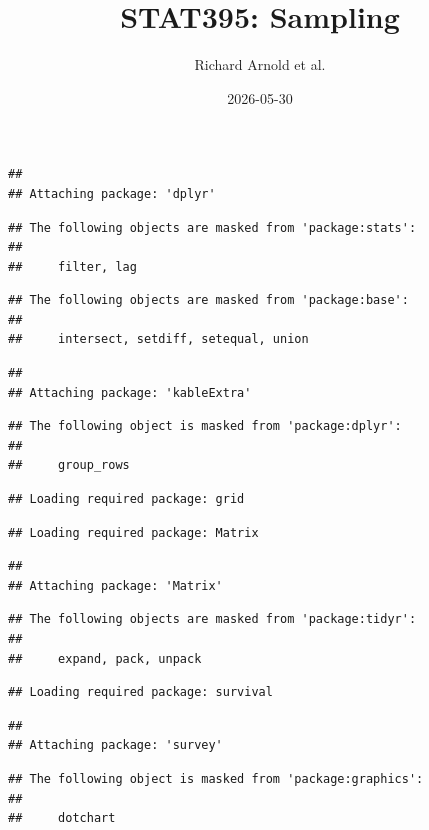\documentclass[
]{book}
\title{STAT395: Sampling}
\author{Richard Arnold et al.}
\date{2026-05-30}
\begin{document}
\maketitle

{
\setcounter{tocdepth}{1}
\tableofcontents
}
\begin{verbatim}
## 
## Attaching package: 'dplyr'
\end{verbatim}

\begin{verbatim}
## The following objects are masked from 'package:stats':
## 
##     filter, lag
\end{verbatim}

\begin{verbatim}
## The following objects are masked from 'package:base':
## 
##     intersect, setdiff, setequal, union
\end{verbatim}

\begin{verbatim}
## 
## Attaching package: 'kableExtra'
\end{verbatim}

\begin{verbatim}
## The following object is masked from 'package:dplyr':
## 
##     group_rows
\end{verbatim}

\begin{verbatim}
## Loading required package: grid
\end{verbatim}

\begin{verbatim}
## Loading required package: Matrix
\end{verbatim}

\begin{verbatim}
## 
## Attaching package: 'Matrix'
\end{verbatim}

\begin{verbatim}
## The following objects are masked from 'package:tidyr':
## 
##     expand, pack, unpack
\end{verbatim}

\begin{verbatim}
## Loading required package: survival
\end{verbatim}

\begin{verbatim}
## 
## Attaching package: 'survey'
\end{verbatim}

\begin{verbatim}
## The following object is masked from 'package:graphics':
## 
##     dotchart
\end{verbatim}
\end{document}
